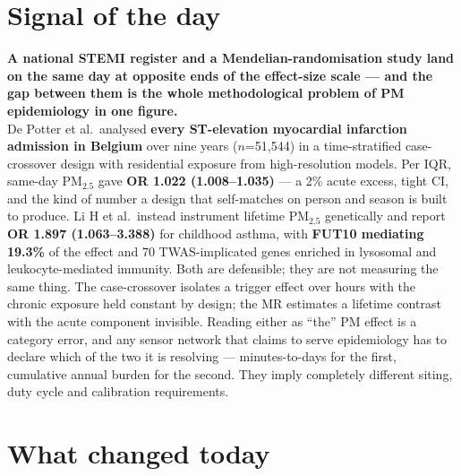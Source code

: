\documentclass[10pt]{article}
\begin{document}
\vspace{6mm}

\section*{\sffamily\bfseries\color{Deep}Signal of the day}
\vspace{-1.5mm}{\color{Amber}\rule{\linewidth}{1.1pt}}\vspace{2.5mm}

\begin{keybox}
{\sffamily\bfseries\small\color{Deep}A national STEMI register and a Mendelian-randomisation
study land on the same day at opposite ends of the effect-size scale --- and the gap
between them is the whole methodological problem of PM epidemiology in one figure.}\\[1.4mm]
\footnotesize
De Potter et al.\ analysed \textbf{every ST-elevation myocardial infarction admission in
Belgium} over nine years ($n$=51{,}544) in a time-stratified case-crossover design with
residential exposure from high-resolution models. Per IQR, same-day PM$_{2.5}$ gave
\textbf{OR 1.022 (1.008--1.035)} --- a 2\% acute excess, tight CI, and the kind of number
a design that self-matches on person and season is built to produce. Li H et al.\ instead
instrument lifetime PM$_{2.5}$ genetically and report \textbf{OR 1.897 (1.063--3.388)}
for childhood asthma, with \textbf{FUT10 mediating 19.3\%} of the effect and 70
TWAS-implicated genes enriched in lysosomal and leukocyte-mediated immunity.
Both are defensible; they are not measuring the same thing. The case-crossover isolates a
trigger effect over hours with the chronic exposure held constant by design; the MR
estimates a lifetime contrast with the acute component invisible. Reading either as
``the'' PM effect is a category error, and any sensor network that claims to serve
epidemiology has to declare which of the two it is resolving --- minutes-to-days for the
first, cumulative annual burden for the second. They imply completely different siting,
duty cycle and calibration requirements.
\end{keybox}

\vspace{3mm}

\section*{\sffamily\bfseries\color{Deep}What changed today}
\vspace{-1.5mm}{\color{Amber}\rule{\linewidth}{1.1pt}}\vspace{2.5mm}
\end{document}
